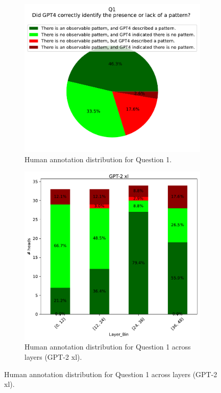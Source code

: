 \documentclass[11pt]{article}
\newcommand{\GPTxl}{GPT-2 xl}
\begin{document}
\begin{figure}[tp]
    \centering
    \begin{subfigure}{\columnwidth}
    \centering
    \includegraphics[scale=0.45]
        {figures/human_validation/q1_pie}
        \caption{Human annotation distribution for Question 1.}
    \end{subfigure}

    \begin{subfigure}{\columnwidth}
        \includegraphics[scale=0.45]
        {figures/human_validation/q1_by_layer_gpt}
        \caption{Human annotation distribution for Question 1 across layers (\GPTxl{}).}
    \end{subfigure}


\end{figure}
\end{document}

